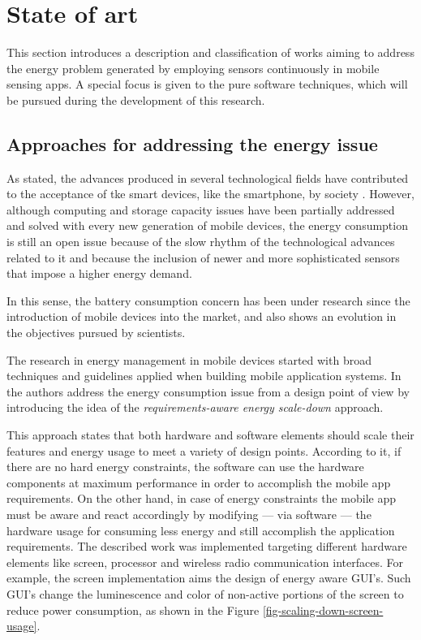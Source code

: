 \section{State of art} 
\label{sec:state_of_art}
This section introduces a description and classification of works aiming to address the energy problem generated by employing sensors continuously in mobile sensing apps.
A special focus is given to the pure software techniques, which will be pursued during the development of this research.

\subsection{Approaches for addressing the energy issue}
\label{sub:approaches_for_addressing_the_energy_issue}

As stated, the advances produced in several technological fields have contributed to the acceptance of tke smart devices, like the smartphone, by society \cite{Lane2010,Ra2012}.
However, although computing and storage capacity issues have been partially addressed and solved with every new generation of mobile devices, the energy consumption is still an open issue because of the slow rhythm of the technological advances related to it and because the inclusion of newer and more sophisticated sensors that impose a higher energy demand.

In this sense, the battery consumption concern has been under research since the introduction of mobile devices into the market, and also shows an evolution in the objectives pursued by scientists. 

The research in energy management in mobile devices started with broad techniques and guidelines applied when building mobile application systems.
In \cite{Mayo2004} the authors address the energy consumption issue from a design point of view by introducing the idea of the \emph{requirements-aware energy scale-down} approach. 

This approach states that both hardware and software elements should scale their features and energy usage to meet a variety of design points.
According to it, if there are no hard energy constraints, the software can use the hardware components at maximum performance in order to accomplish the mobile app requirements.
On the other hand, in case of energy constraints the mobile app must be aware and react accordingly by modifying --- via software --- the hardware usage for consuming less energy and still accomplish the application requirements.
The described work was implemented targeting different hardware elements like screen, processor and wireless radio communication interfaces.
For example, the screen implementation aims the design of energy aware GUI's.
Such GUI's change the luminescence and color of non-active portions of the screen to reduce power consumption, as shown in the Figure \ref{fig-scaling-down-screen-usage}.

